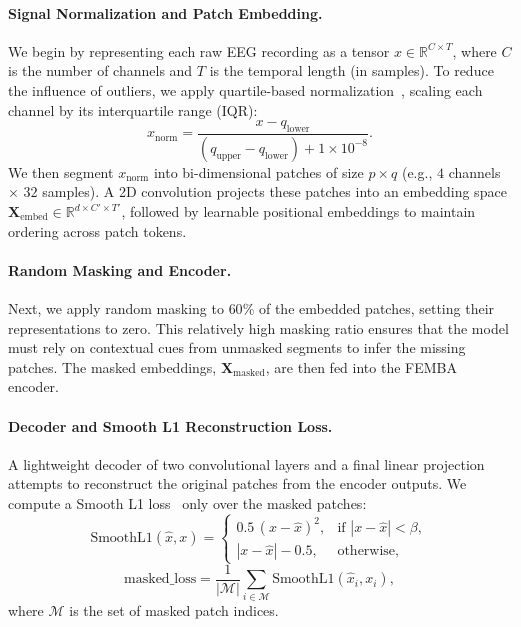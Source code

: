 \paragraph{Signal Normalization and Patch Embedding.}
We begin by representing each raw EEG recording as a tensor $x \in \mathbb{R}^{C \times T}$, where $C$ is the number of channels and $T$ is the temporal length (in samples). To reduce the influence of outliers, we apply quartile-based normalization~\cite{bedeeuzzaman2012automatic}, scaling each channel by its interquartile range (IQR):
\begin{equation*}
    x_{\text{norm}} = \frac{x - q_{\text{lower}}}{(q_{\text{upper}} - q_{\text{lower}}) + 1 \times 10^{-8}}.
\end{equation*}
We then segment $x_{\text{norm}}$ into bi-dimensional patches of size $p \times q$ (e.g., $4$ channels $\times$ $32$ samples). A 2D convolution projects these patches into an embedding space $\mathbf{X}_{\text{embed}} \in \mathbb{R}^{d \times C' \times T'}$, followed by learnable positional embeddings to maintain ordering across patch tokens.

\paragraph{Random Masking and Encoder.}
Next, we apply random masking to $60\%$ of the embedded patches, setting their representations to zero. This relatively high masking ratio ensures that the model must rely on contextual cues from unmasked segments to infer the missing patches. The masked embeddings, $\mathbf{X}_{\text{masked}}$, are then fed into the FEMBA encoder.

\paragraph{Decoder and Smooth L1 Reconstruction Loss.}
A lightweight decoder of two convolutional layers and a final linear projection attempts to reconstruct the original patches from the encoder outputs. We compute a Smooth L1 loss~\cite{girshick2015fastrcnn} only over the masked patches:
\begin{equation*}
    \text{SmoothL1}(\hat{x}, x) =
    \begin{cases}
        0.5 \,(x - \hat{x})^2, & \text{if } |x - \hat{x}| < \beta, \\
        |x - \hat{x}| - 0.5, & \text{otherwise},
    \end{cases}
\end{equation*}
\begin{equation*}
    \text{masked\_loss} = \frac{1}{|\mathcal{M}|} \sum_{i \in \mathcal{M}} \text{SmoothL1}(\hat{x}_i, x_i),
\end{equation*}
where $\mathcal{M}$ is the set of masked patch indices.


